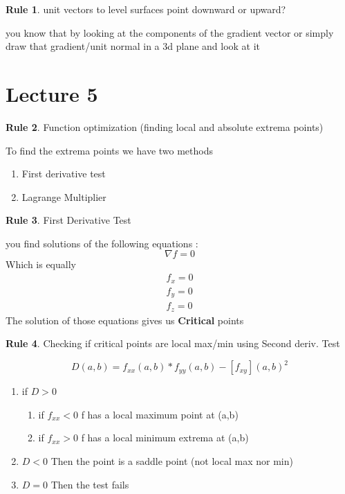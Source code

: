 \documentclass[11pt]{article}
\theoremstyle{definition}
\newtheorem{reg}{Rule}
\begin{document}
\begin{reg}
unit vectors to level surfaces point downward or upward?
\end{reg}
you know that by looking at the components of the gradient vector or simply draw that gradient/unit normal in a 3d plane and look at it
\section{Lecture 5}
\begin{reg}
	Function optimization (finding local and absolute extrema points)
\end{reg}
To find the extrema points we have two methods
\begin{enumerate}

\item First derivative test
\item Lagrange Multiplier

\end{enumerate}
\begin{reg}
First Derivative Test 
\end{reg}
you find solutions of the following equations :
\begin{equation}
	\nabla f= 0 
\end{equation}
Which is equally
\begin{align}
	f_x=0\\f_y=0\\f_z=0
\end{align}	
The solution of those equations gives us \textbf{Critical} points
\begin{reg}
Checking if critical points are local max/min using Second deriv. Test
\end{reg}
\begin{equation}
	D(a,b) = f_{xx}(a,b) *f_{yy} (a,b) - [f_{xy}](a,b) ^2
\end{equation}
\begin{enumerate}

\item if $D>0$
	\begin{enumerate}
	
		\item if $f_{xx}<0$ f has a local maximum point at (a,b)
		\item  if $f_{xx}>0$ f has a local minimum extrema at (a,b) 
	
	\end{enumerate}
\item $D<0$ Then the point is a saddle point (not local max nor min)
\item $D=0$ Then the test fails

\end{enumerate}
\end{document}
